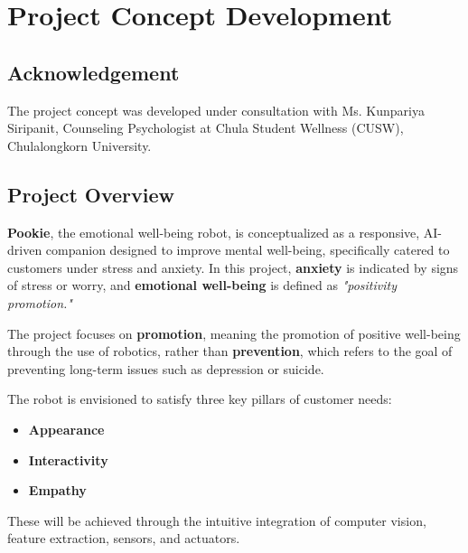 \section{Project Concept Development}

\subsection{Acknowledgement}
The project concept was developed under consultation with Ms. Kunpariya Siripanit, Counseling Psychologist at Chula Student Wellness (CUSW), Chulalongkorn University.

\subsection{Project Overview}
\textbf{Pookie}, the emotional well-being robot, is conceptualized as a responsive, AI-driven companion designed to improve mental well-being, specifically catered to customers under stress and anxiety. In this project, \textbf{anxiety} is indicated by signs of stress or worry, and \textbf{emotional well-being} is defined as \textit{"positivity promotion."}

The project focuses on \textbf{promotion}, meaning the promotion of positive well-being through the use of robotics, rather than \textbf{prevention}, which refers to the goal of preventing long-term issues such as depression or suicide.

The robot is envisioned to satisfy three key pillars of customer needs:
\begin{itemize}
    \item \textbf{Appearance}
    \item \textbf{Interactivity}
    \item \textbf{Empathy}
\end{itemize}
These will be achieved through the intuitive integration of computer vision, feature extraction, sensors, and actuators.


